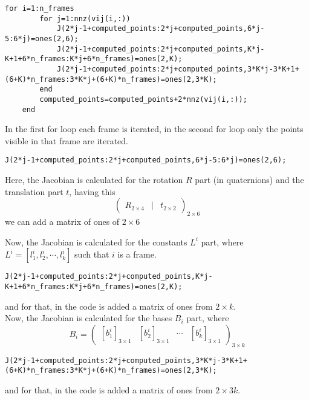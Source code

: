 \begin{lstlisting}[style=Matlab-editor]
for i=1:n_frames
        for j=1:nnz(vij(i,:))        
            J(2*j-1+computed_points:2*j+computed_points,6*j-5:6*j)=ones(2,6);
            J(2*j-1+computed_points:2*j+computed_points,K*j-K+1+6*n_frames:K*j+6*n_frames)=ones(2,K);
            J(2*j-1+computed_points:2*j+computed_points,3*K*j-3*K+1+(6+K)*n_frames:3*K*j+(6+K)*n_frames)=ones(2,3*K);
        end
        computed_points=computed_points+2*nnz(vij(i,:));
    end
\end{lstlisting}
\noindent In the first for loop each frame is iterated, in the second for loop only the points visible in that frame are iterated.\\
\begin{lstlisting}[style=Matlab-editor]
J(2*j-1+computed_points:2*j+computed_points,6*j-5:6*j)=ones(2,6);
\end{lstlisting}
\noindent Here, the Jacobian is calculated for the rotation $R$ part (in quaternions) and the translation part $t$, having this
\begin{equation}
\begin{pmatrix}
R_{2\times 4} & | & t_{2\times 2}
\end{pmatrix}_{2\times 6}
\end{equation}
we can add a matrix of ones of $2\times 6$

\noindent Now, the Jacobian is calculated for the constants $L^{i}$ part, where $L^{i}=[l_{1}^{i},l_{2}^{i}, \cdots, l_{k}^{i}]$ such that $i$ is a frame.
\begin{lstlisting}[style=Matlab-editor]
J(2*j-1+computed_points:2*j+computed_points,K*j-K+1+6*n_frames:K*j+6*n_frames)=ones(2,K);
\end{lstlisting}
and for that, in the code is added a matrix of ones from $2\times k$.\\

\noindent Now, the Jacobian is calculated for the bases $B_{i}$ part, where
\begin{equation}
B_{i}=\begin{pmatrix}
[b_{1}^{i}]_{3\times 1} & [b_{2}^{i}]_{3\times 1} & \cdots & [b_{k}^{i}]_{3\times 1}
\end{pmatrix}_{3\times k}
\end{equation}
\begin{lstlisting}[style=Matlab-editor]
J(2*j-1+computed_points:2*j+computed_points,3*K*j-3*K+1+(6+K)*n_frames:3*K*j+(6+K)*n_frames)=ones(2,3*K);
\end{lstlisting}
\noindent and for that, in the code is added a matrix of ones from $2\times 3k$.\\

